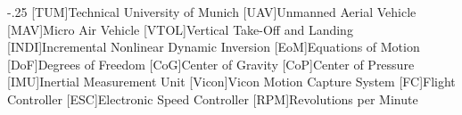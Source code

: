 \documentclass[headsepline,footsepline,footinclude=false,oneside,fontsize=11pt,paper=a4,listof=totoc,bibliography=totoc]{scrbook} %
\begin{document}


\frontmatter{}





\tableofcontents{}

\mainmatter{}











\appendix{}


\begin{acronym}
	\itemsep-.25\baselineskip
	[TUM]{Technical University of Munich}
	[UAV]{Unmanned Aerial Vehicle}
	[MAV]{Micro Air Vehicle}
	[VTOL]{Vertical Take-Off and Landing}
	[INDI]{Incremental Nonlinear Dynamic Inversion}
	[EoM]{Equations of Motion}
	[DoF]{Degrees of Freedom}
	[CoG]{Center of Gravity}
	[CoP]{Center of Pressure}
	[IMU]{Inertial Measurement Unit}
	[Vicon]{Vicon Motion Capture System}
	[FC]{Flight Controller}
	[ESC]{Electronic Speed Controller}
	[RPM]{Revolutions per Minute}
\end{acronym}

\listoffigures{}
\listoftables{}
\printbibliography{}
\end{document}
